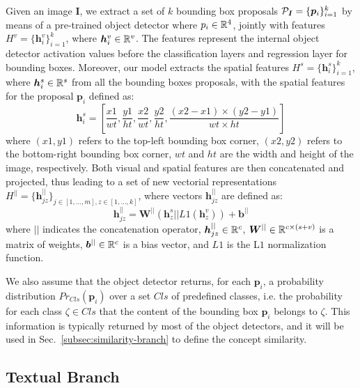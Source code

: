Given an image $\bm{I}$, we extract a set of $k$ bounding box
proposals $\mathcal{P}_{\bm{I}} = \{ \bm{p}_i \}^k_{i=1}$ by means of a
pre-trained object detector where $p_i \in \mathbb{R}^4$, jointly with
features $H^v = \{ \bm{h}^v_i \}^k_{i=1}$, where $\bm{h}^v_i \in
\mathbb{R}^v$. The features represent the internal object detector
activation values before the classification layers and regression
layer for bounding boxes. Moreover, our model extracts the spatial
features $H^s = \{ \bm{h}^s_i \}^k_{i=1}$, where $\bm{h}^s_i \in
\mathbb{R}^s$ from all the bounding boxes proposals, with the spatial
features for the proposal $\bm{p}_i$ defined as:
\begin{equation}
  \bm{h}^s_i = \left[ \frac{x1}{wt}, \frac{y1}{ht}, \frac{x2}{wt}, \frac{y2}{ht}, \frac{(x2 - x1) \times (y2 - y1)}{wt \times ht}  \right]
\end{equation}
where $(x1, y1)$ refers to the top-left bounding box corner, $(x2,
y2)$ refers to the bottom-right bounding box corner, $wt$ and $ht$ are
the width and height of the image, respectively. Both visual and
spatial features are then concatenated and projected, thus leading to
a set of new vectorial representations $H^{||} = \{ \bm{h}^{||}_{jz}
\}_{j \in [1, \ldots, m], z \in [1, \ldots, k]}$, where vectors
$\bm{h}^{||}_{jz}$ are defined as:
\begin{equation}
  \bm{h}^{||}_{jz} = \bm{W}^{||} \left( \bm{h}^s_z || L1(\bm{h}^v_z) \right) + \bm{b}^{||}
  \label{eq:h-par-jz}
\end{equation}
where $||$ indicates the concatenation operator, $\bm{h}^{||}_{jz} \in
\mathbb{R}^c$, $\bm{W}^{||} \in \mathbb{R}^{c \times (s + v)}$ is a matrix of
weights, $\bm{b}^{||} \in \mathbb{R}^c$ is a bias vector, and $L1$ is the
L$1$ normalization function.

We also assume that the object detector returns, for each $\bm{p}_i$,
a probability distribution $Pr_{Cls}(\bm{p}_i)$ over a set $Cls$ of
predefined classes, i.e. the probability for each class $\zeta \in
Cls$ that the content of the bounding box $\bm{p}_i$ belongs to
$\zeta$. This information is typically returned by most of the object
detectors, and it will be used in Sec.~\ref{subsec:similarity-branch} to define the concept similarity.

\subsection{Textual Branch}


